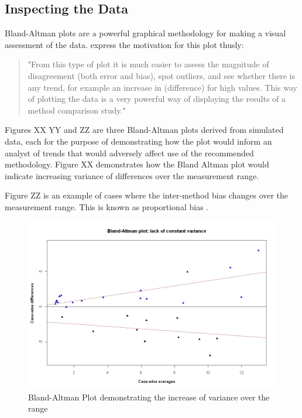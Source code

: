 \documentclass[Chap2main.tex]{subfiles}
\begin{document}
	\subsection{Inspecting the Data}
	Bland-Altman plots are a powerful graphical methodology for making a visual assessment of the data. \citet*{BA83} express the
	motivation for this plot thusly:
	\begin{quote}
		"From this type of plot it is much easier to assess the magnitude of disagreement (both error and bias), spot outliers, and see
		whether there is any trend, for example an increase in (difference) for high values. This way of plotting the data is a
		very powerful way of displaying the results of a method comparison study."
	\end{quote}
	
	
	Figures XX YY and ZZ are three Bland-Altman plots derived from simulated data, each for the purpose of demonstrating how the plot
	would inform an analyst of trends that would adversely affect use of the recommended methodology. Figure XX demonstrates how the
	Bland Altman plot would indicate increasing variance of differences over the measurement range.
	
	Figure ZZ is an example of cases where the inter-method bias changes over the measurement range. This is known as proportional
	bias \citep{ludbrook97}.
	
	\newpage
	\begin{figure}[h!]
		\begin{center}
			\includegraphics[width=125mm]{BAFanEffect.jpeg}
			\caption{Bland-Altman Plot demonstrating the increase of variance over the range}\label{BAFanEffect}
		\end{center}
	\end{figure}
	
\end{document}
